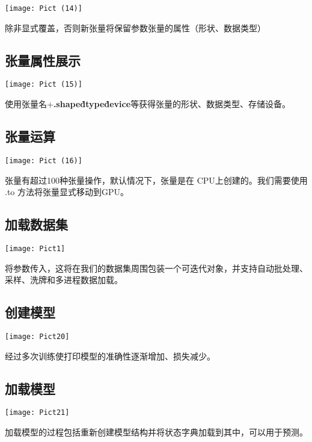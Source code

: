 \documentclass[a4paper, 12pt]{article}
\begin{document}
\texttt{[image: Pict (14)]}

除非显式覆盖，否则新张量将保留参数张量的属性（形状、数据类型）
\subsection{\small 张量属性展示}

\texttt{[image: Pict (15)]}

使用张量名+\textbf{.shape\.dtype\.device}等获得张量的形状、数据类型、存储设备。
\subsection{\small 张量运算}

\texttt{[image: Pict (16)]}

张量有超过100种张量操作，默认情况下，张量是在 CPU上创建的。我们需要使用 .to 方法将张量显式移动到GPU。
\subsection{\small 加载数据集}

\texttt{[image: Pict1]}

将参数传入，这将在我们的数据集周围包装一个可迭代对象，并支持自动批处理、采样、洗牌和多进程数据加载。

\subsection{\small 创建模型}
\texttt{[image: Pict20]}

经过多次训练使打印模型的准确性逐渐增加、损失减少。
\subsection{\small 加载模型}
\texttt{[image: Pict21]}

加载模型的过程包括重新创建模型结构并将状态字典加载到其中，可以用于预测。
\end{document}
